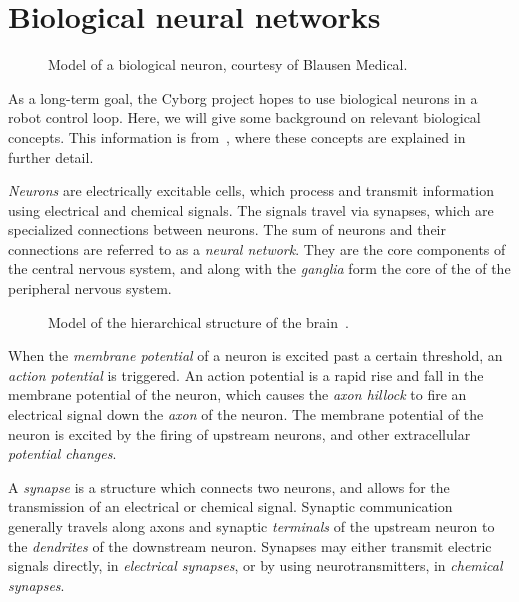 \documentclass[\rootfolder/main.tex]{subfiles}
\begin{document}

\section{Biological neural networks}

\begin{figure}
    \caption[Model of a biological neuron.]%
            {Model of a biological neuron, courtesy of Blausen Medical.}
    \label{fig:biological_neuron}
\end{figure}

As a long-term goal, the Cyborg project hopes to use biological neurons in a robot control loop.
Here, we will give some background on relevant biological concepts.
This information is from~\cite{Knudsen2016}, where these concepts are explained in further detail.

\emph{Neurons} are electrically excitable cells, which process and transmit information using electrical and chemical signals.
The signals travel via synapses, which are specialized connections between neurons.
The sum of neurons and their connections are referred to as a \emph{neural network}.
They are the core components of the central nervous system, and along with the \emph{ganglia} form the core of the of the peripheral nervous system.

\begin{wrapfigure}{R}{0.5\columnwidth}
    \caption[Model of the hierarchical structure of the brain.]%
            {Model of the hierarchical structure of the brain~\cite{Perry1999}.}
    \label{fig:brain-hierarchy}
\end{wrapfigure}

When the \emph{membrane potential} of a neuron is excited past a certain threshold, an \emph{action potential} is triggered.
An action potential is a rapid rise and fall in the membrane potential of the neuron, which causes the \emph{axon hillock} to fire an electrical signal down the \emph{axon} of the neuron.
The membrane potential of the neuron is excited by the firing of upstream neurons, and other extracellular \emph{potential changes}.

A \emph{synapse} is a structure which connects two neurons, and allows for the transmission of an electrical or chemical signal.
Synaptic communication generally travels along axons and synaptic \emph{terminals} of the upstream neuron to the \emph{dendrites} of the downstream neuron.
Synapses may either transmit electric signals directly, in \emph{electrical synapses}, or by using neurotransmitters, in \emph{chemical synapses}.
\end{document}
